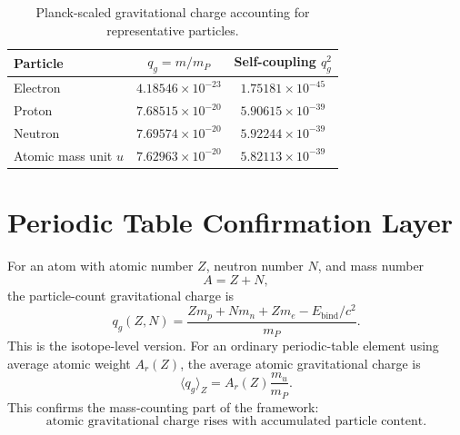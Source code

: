 \documentclass[11pt,a4paper]{article}
\renewcommand{\boxed}[1]{#1}
\begin{document}
\begin{table}[htbp]
\centering
\caption{Planck-scaled gravitational charge accounting for representative particles.}
\label{tab:particle-charge}
\begin{tabular}{lcc}
\toprule
Particle & $q_g=m/m_P$ & Self-coupling $q_g^2$ \\
\midrule
Electron & $4.18546\times 10^{-23}$ & $1.75181\times 10^{-45}$ \\
Proton & $7.68515\times 10^{-20}$ & $5.90615\times 10^{-39}$ \\
Neutron & $7.69574\times 10^{-20}$ & $5.92244\times 10^{-39}$ \\
Atomic mass unit $u$ & $7.62963\times 10^{-20}$ & $5.82113\times 10^{-39}$ \\
\bottomrule
\end{tabular}
\end{table}

\section{Periodic Table Confirmation Layer}

For an atom with atomic number $Z$, neutron number $N$, and mass number
\begin{equation}
 A=Z+N,
\label{eq:mass-number}
\end{equation}
the particle-count gravitational charge is
\begin{equation}
\boxed{
q_g(Z,N)=\frac{Zm_p+Nm_n+Zm_e-E_{\mathrm{bind}}/c^2}{m_P}.
}
\label{eq:isotope-qg}
\end{equation}
This is the isotope-level version. For an ordinary periodic-table element using average atomic weight $A_r(Z)$, the average atomic gravitational charge is
\begin{equation}
\boxed{\langle q_g\rangle_Z=A_r(Z)\frac{m_u}{m_P}.}
\label{eq:average-qg}
\end{equation}
This confirms the mass-counting part of the framework:
\begin{equation}
\boxed{\text{atomic gravitational charge rises with accumulated particle content}.}
\label{eq:charge-rises}
\end{equation}
\end{document}
